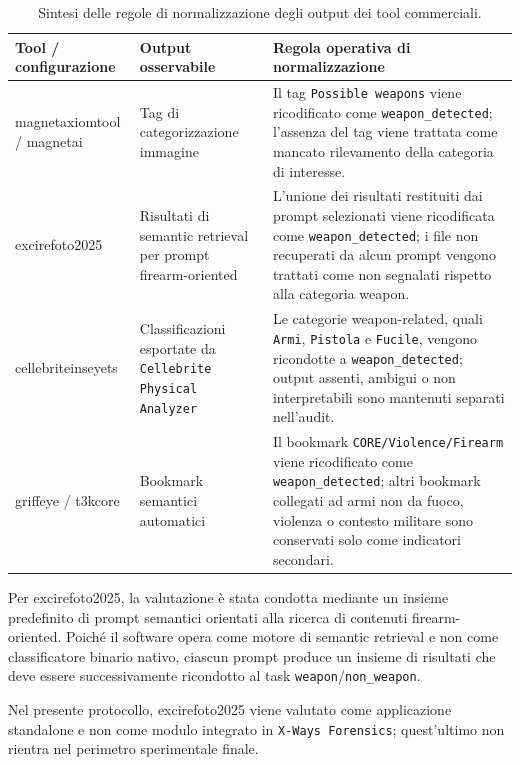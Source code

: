 \begin{table}[H]
\centering
\caption{Sintesi delle regole di normalizzazione degli output dei tool commerciali.}
\label{tab:methodology-tool-normalization-summary}
\footnotesize
\renewcommand{\arraystretch}{1.15}
\begin{tabularx}{\textwidth}{@{}L{3.4cm}L{4.2cm}X@{}}
\toprule
\textbf{Tool / configurazione} &
\textbf{Output osservabile} &
\textbf{Regola operativa di normalizzazione} \\
\midrule
\gls{magnetaxiomtool} / \gls{magnetai}
&
Tag di categorizzazione immagine
&
Il tag \texttt{Possible weapons} viene ricodificato come
\texttt{weapon\_detected}; l'assenza del tag viene trattata come mancato
rilevamento della categoria di interesse. \\
\gls{excirefoto2025}
&
Risultati di semantic retrieval per prompt firearm-oriented
&
L'unione dei risultati restituiti dai prompt selezionati viene ricodificata
come \texttt{weapon\_detected}; i file non recuperati da alcun prompt vengono
trattati come non segnalati rispetto alla categoria weapon. \\
\gls{cellebriteinseyets}
&
Classificazioni esportate da \texttt{Cellebrite Physical Analyzer}
&
Le categorie weapon-related, quali \texttt{Armi}, \texttt{Pistola} e
\texttt{Fucile}, vengono ricondotte a \texttt{weapon\_detected}; output
assenti, ambigui o non interpretabili sono mantenuti separati nell'audit. \\
\gls{griffeye} / \gls{t3kcore}
&
Bookmark semantici automatici
&
Il bookmark \texttt{CORE/Violence/Firearm} viene ricodificato come
\texttt{weapon\_detected}; altri bookmark collegati ad armi non da fuoco,
violenza o contesto militare sono conservati solo come indicatori secondari. \\
\bottomrule
\end{tabularx}
\end{table}


Per \gls{excirefoto2025}, la valutazione è stata condotta mediante un insieme
predefinito di prompt semantici orientati alla ricerca di contenuti
firearm-oriented. Poiché il software opera come motore di semantic retrieval e
non come classificatore binario nativo, ciascun prompt produce un insieme di
risultati che deve essere successivamente ricondotto al task
\texttt{weapon}/\texttt{non\_weapon}.

Nel presente protocollo, \gls{excirefoto2025} viene valutato come applicazione
standalone e non come modulo integrato in \texttt{X-Ways Forensics}; quest'ultimo
non rientra nel perimetro sperimentale finale.

